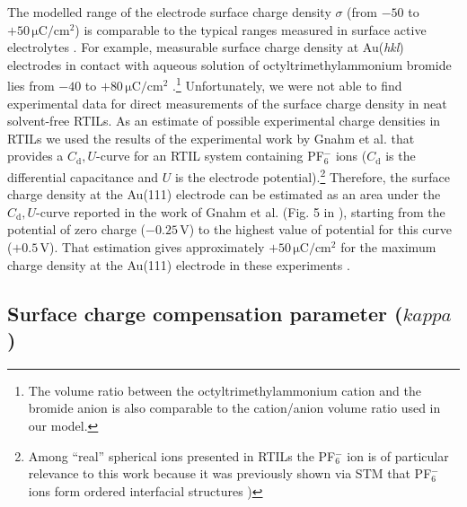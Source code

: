 \documentclass[final,5p,times,twocolumn]{elsarticle}
\begin{document}
The modelled range of the electrode surface charge density $\sigma$ (from $-50$ to $+50\,\mathrm{\mu C/cm^2}$) is comparable to the typical ranges measured in surface active electrolytes \cite{Schmickler2010}. For example, measurable surface charge density at Au(\textit{hkl}) electrodes in contact with aqueous solution of octyltrimethylammonium bromide lies from $-40$ to $+80\,\mathrm{\mu C/cm^2}$ \cite{Vivek2012}.\footnote{The volume ratio between the octyltrimethylammonium cation and the bromide anion is also comparable to the cation/anion volume ratio used in our model.} Unfortunately, we were not able to find experimental data for direct measurements of the surface charge density in neat solvent-free RTILs. As an estimate of possible experimental charge densities in RTILs we used the results of the experimental work by Gnahm et al. \cite{Gnahm2011} that provides a $C_\mathrm{d},U$-curve for an RTIL system containing PF$_6^-$ ions ($C_\mathrm{d}$ is the differential capacitance and $U$ is the electrode potential).\footnote{Among ``real'' spherical ions presented in RTILs the PF$_6^-$ ion is of particular relevance to this work because it was previously shown via STM that PF$_6^-$ ions form ordered interfacial structures \cite{Pan2006})} Therefore, the surface charge density at the Au(111) electrode can be estimated as an area under the $C_\mathrm{d},U$-curve reported in the work of Gnahm et al. (Fig. 5  in \cite{Gnahm2011}), starting from the potential of zero charge ($-0.25\,\mathrm{V}$) to the highest value of potential for this curve ($+0.5\,\mathrm{V}$). That estimation gives approximately $+50\,\mathrm{\mu C/cm^2}$ for the maximum charge density at the Au(111) electrode in these experiments \cite{Gnahm2011}.

\subsection{Surface charge compensation parameter ($kappa$)}
\end{document}
